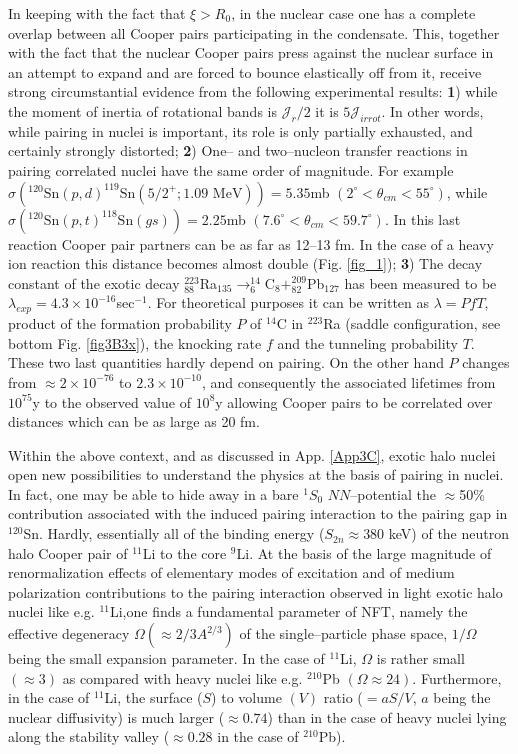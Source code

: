 \begin{subappendices}
 
 In keeping with the fact that $\xi>R_0$, in the nuclear case one has a complete overlap between all Cooper pairs participating in the condensate. This, together with the fact that the nuclear Cooper pairs press against the nuclear surface in an attempt to expand and are forced to bounce elastically off from  it, receive strong circumstantial evidence from the following experimental results: \textbf{1}) while the moment of inertia of rotational bands is $\mathcal J_r/2$ it is $5 \mathcal J_{irrot}$. In other words, while pairing in nuclei is important, its role is only partially exhausted, and certainly strongly distorted; \textbf{2}) One-- and two--nucleon transfer reactions in pairing correlated nuclei have the same order of magnitude. For example $\sigma (^{120}\text{Sn}(p,d)^{119}\text{Sn}(5/2^+; 1.09 \text{ MeV}))=5.35 $mb $(2^\circ<\theta_{cm}<55^\circ)$, while $\sigma (^{120}\text{Sn}(p,t)^{118}\text{Sn}(gs))=2.25 $mb $(7.6^\circ<\theta_{cm}<59.7^\circ)$. In this last reaction Cooper pair partners can be as far as 12--13 fm. In the case of a heavy ion reaction this distance becomes almost double (Fig. \ref{fig_1}); \textbf{3}) The decay constant of the exotic decay $^{223}_{88}$Ra$_{135}\rightarrow^{14}_6$C$_8+^{209}_{82}$Pb$_{127}$ has been measured to be $\lambda_{exp}=4.3\times10^{-16}$sec$^{-1}$. For theoretical purposes it can be written as $\lambda=PfT$, product of the formation probability $P$ of $^{14}$C in $^{223}$Ra (saddle configuration, see bottom Fig. \ref{fig3B3x}), the knocking rate $f$ and the tunneling probability $T$. These two last quantities hardly depend on pairing. On the other hand $P$ changes from $\approx 2\times10^{-76}$ to $2.3\times10^{-10}$, and consequently the associated lifetimes from $10^{75}$y to the observed value of $10^8$y  allowing Cooper pairs to be correlated over distances which can be as large as 20 fm.
 
 
 Within the above context, and as discussed in App. \ref{App3C}, exotic halo nuclei open new possibilities to understand the physics at the basis of pairing in nuclei. In fact, one may be able to hide away in a bare $^1S_0$ $NN$--potential the $\approx$50\% contribution associated with the induced pairing interaction to the pairing gap in $^{120}$Sn. Hardly, essentially all of the binding energy ($S_{2n}\approx380$ keV) of the neutron halo Cooper pair of $^{11}$Li to the core $^{9}$Li. At the basis of the large magnitude of renormalization effects of elementary modes of excitation and of medium polarization contributions to the pairing interaction observed in light exotic halo nuclei like e.g. $^{11}$Li,one finds a fundamental parameter of NFT, namely the effective degeneracy $\Omega(\approx2/3A^{2/3})$ of the single--particle phase space, $1/\Omega$ being the small expansion parameter. In the case of $^{11}$Li, $\Omega$ is rather small $(\approx3)$ as compared with heavy nuclei like e.g. $^{210}$Pb $(\Omega\approx24)$. Furthermore, in the case of $^{11}$Li, the surface ($S$) to volume $(V)$ ratio ($=aS/V$, $a$ being the nuclear diffusivity) is much larger ($\approx0.74$) than in the case of heavy nuclei lying along the stability valley ($\approx0.28$ in the case of $^{210}$Pb).

\end{subappendices}
